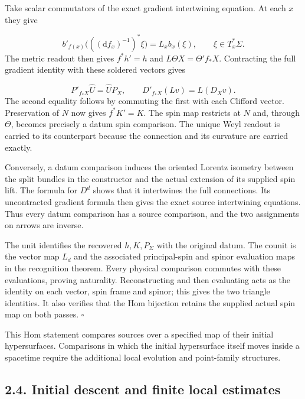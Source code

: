\documentclass[
  english,
  11pt,
  reqno]{amsart}
\begin{document}
Take scalar commutators of the exact gradient intertwining equation. At
each \(x\) they give

\label{eq:online-initial-comparison-symbol-law} \[
b'_{f(x)}
 \bigl(((\mathrm df_x)^{-1})^*\xi\bigr)
=L_xb_x(\xi),\qquad \xi\in T_x^*\Sigma.
\] The metric readout then gives \(f^*h'=h\) and
\(L\Theta X=\Theta'f_*X\). Contracting the full gradient identity with
these soldered vectors gives

\label{eq:online-initial-comparison-connection-law} \[
P'_{f_*X}\widehat U=\widehat U P_X,
\qquad
D'_{f_*X}(Lv)=L(D_Xv).
\] The second equality follows by commuting the first with each Clifford
vector. Preservation of \(N\) now gives \(f^*K'=K\). The spin map
restricts at \(N\) and, through \(\Theta\), becomes precisely a datum
spin comparison. The unique Weyl readout is carried to its counterpart
because the connection and its curvature are carried exactly.

Conversely, a datum comparison induces the oriented Lorentz isometry
between the split bundles in the constructor and the actual extension of
its supplied spin lift. The formula for \(D^d\) shows that it
intertwines the full connections. Its uncontracted gradient formula then
gives the exact source intertwining equations. Thus every datum
comparison has a source comparison, and the two assignments on arrows
are inverse.

The unit identifies the recovered \(h,K,P_\Sigma\) with the original
datum. The counit is the vector map \(L_d\) and the associated
principal-spin and spinor evaluation maps in the recognition theorem.
Every physical comparison commutes with these evaluations, proving
naturality. Reconstructing and then evaluating acts as the identity on
each vector, spin frame and spinor; this gives the two triangle
identities. It also verifies that the Hom bijection retains the supplied
actual spin map on both passes. \hfill\(\square\)

This Hom statement compares sources over a specified map of their
initial hypersurfaces. Comparisons in which the initial hypersurface
itself moves inside a spacetime require the additional local evolution
and point-family structures.

\subsection{2.4. Initial descent and finite local
estimates}\label{initial-descent-and-finite-local-estimates}\label{sec:online-initial-descent-and-estimates}
\end{document}
